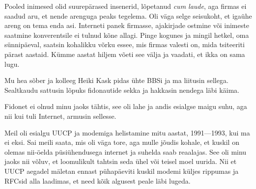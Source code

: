 Pooled inimesed olid suurepärased insenerid, lõpetanud \emph{cum laude}, aga firmas ei saadud aru, et nende arenguga peaks tegelema. 
Oli väga selge seisukoht, et igaühe areng on tema enda asi. 
Interneti panek firmasse, ajakirjade ostmine või 
inimeste saatmine konverentsile ei tulnud kõne allagi. Pinge 
kogunes ja mingil hetkel, oma sünnipäeval, saatsin kohalikku võrku essee, mis firmas valesti on, mida tsiteeriti
pärast aastaid. Kümme aastat hiljem võeti see välja ja vaadati, et ikka on sama lugu. 


Mu hea sõber ja kolleeg Heiki Kask pidas ühte 
BBSi ja ma liitusin sellega. Sealtkaudu sattusin lõpuks fidonautide 
sekka ja hakkasin nendega läbi käima. 


Fidonet ei olnud minu jaoks tähtis, see oli lahe ja andis 
esialgse maigu suhu, aga nii kui tuli Internet, armusin sellesse.


Meil oli esialgu UUCP ja modemiga helistamine mitu aastat, 1991---1993, kui ma 
ei eksi. Sai meili saata, mis oli väga tore, aga mulle jõudis kohale, et kuskil on 
olemas nii-öelda püsiühendusega internet ja suhelda saab reaalajas. 
See oli minu jaoks nii võluv, et 
loomulikult tahtsin seda ühel või teisel moel uurida. Nii et UUCP 
aegadel mäletan ennast pühapäeviti kuskil modemi küljes rippumas ja RFCsid 
alla laadimas, et need kõik algusest peale läbi lugeda.

